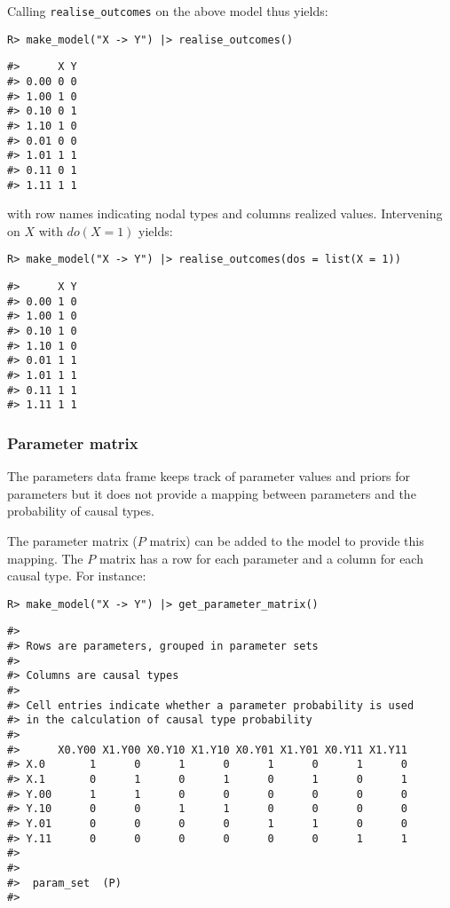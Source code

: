 \documentclass[
  11pt,
  article]{jss}
\begin{document}
Calling \texttt{realise\_outcomes} on the above model thus yields:

\begin{verbatim}
R> make_model("X -> Y") |> realise_outcomes()
\end{verbatim}

\begin{verbatim}
#>      X Y
#> 0.00 0 0
#> 1.00 1 0
#> 0.10 0 1
#> 1.10 1 0
#> 0.01 0 0
#> 1.01 1 1
#> 0.11 0 1
#> 1.11 1 1
\end{verbatim}

with row names indicating nodal types and columns realized values.
Intervening on \(X\) with \(do(X=1)\) yields:

\begin{verbatim}
R> make_model("X -> Y") |> realise_outcomes(dos = list(X = 1))
\end{verbatim}

\begin{verbatim}
#>      X Y
#> 0.00 1 0
#> 1.00 1 0
#> 0.10 1 0
#> 1.10 1 0
#> 0.01 1 1
#> 1.01 1 1
#> 0.11 1 1
#> 1.11 1 1
\end{verbatim}

\hypertarget{parameter-matrix}{%
\subsubsection{Parameter matrix}\label{parameter-matrix}}

The parameters data frame keeps track of parameter values and priors for
parameters but it does not provide a mapping between parameters and the
probability of causal types.

The parameter matrix (\(P\) matrix) can be added to the model to provide
this mapping. The \(P\) matrix has a row for each parameter and a column
for each causal type. For instance:

\begin{verbatim}
R> make_model("X -> Y") |> get_parameter_matrix()
\end{verbatim}

\begin{verbatim}
#> 
#> Rows are parameters, grouped in parameter sets
#> 
#> Columns are causal types
#> 
#> Cell entries indicate whether a parameter probability is used
#> in the calculation of causal type probability
#> 
#>      X0.Y00 X1.Y00 X0.Y10 X1.Y10 X0.Y01 X1.Y01 X0.Y11 X1.Y11
#> X.0       1      0      1      0      1      0      1      0
#> X.1       0      1      0      1      0      1      0      1
#> Y.00      1      1      0      0      0      0      0      0
#> Y.10      0      0      1      1      0      0      0      0
#> Y.01      0      0      0      0      1      1      0      0
#> Y.11      0      0      0      0      0      0      1      1
#> 
#>  
#>  param_set  (P)
#> 
\end{verbatim}
\end{document}
